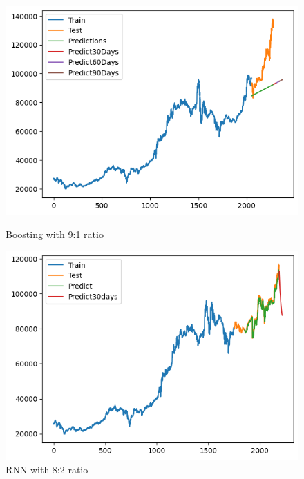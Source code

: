 \documentclass[conference]{IEEEtran}
\begin{document}
\begin{figure}[H]
    \centering
    \begin{minipage}{0.24\textwidth}
        \centering
        \includegraphics[width=\textwidth]{Figure/FPT/boosting91.png}
        \caption{Boosting with 9:1 ratio}
        \label{fig:image1}
    \end{minipage}
    \hfill
    \begin{minipage}{0.24\textwidth}
        \centering
        \includegraphics[width=\textwidth]{Figure/FPT/rnn82.png}
        \caption{RNN with 8:2 ratio}
        \label{fig:image2}
    \end{minipage}
\end{figure}
\end{document}
